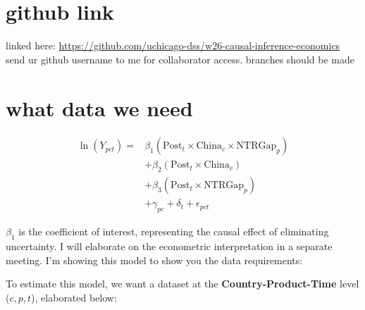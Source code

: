\documentclass[12pt]{article}
\begin{document}
\section {github link}
linked here: \url{https://github.com/uchicago-dss/w26-causal-inference-economics} \\
send ur github username to me for collaborator access. branches should be made


\section{what data we need}

\begin{equation}
    \begin{aligned}
        \ln(Y_{pct}) = & \beta_1 (\text{Post}_t \times \text{China}_c \times \text{NTRGap}_p) \\
                       & + \beta_2 (\text{Post}_t \times \text{China}_c)                      \\
                       & + \beta_3 (\text{Post}_t \times \text{NTRGap}_p)                     \\
                       & + \gamma_{pc} + \delta_{t} + \epsilon_{pct}
    \end{aligned}
\end{equation}

$\beta_1$ is the coefficient of interest, representing the causal effect of eliminating uncertainty. I will elaborate on the econometric interpretation in a separate meeting. I'm showing this model to show you the data requirements:

To estimate this model, we want a dataset at the \textbf{Country-Product-Time} level ($c, p, t$), elaborated below:
\end{document}
